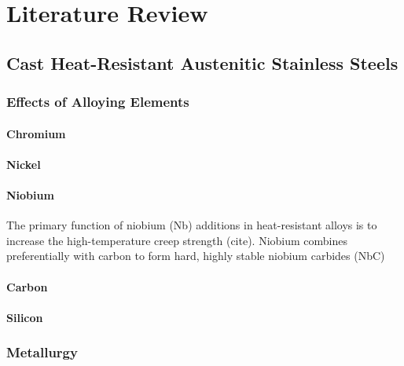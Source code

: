 \chapter{Literature Review} \label{ch:literature-review}

\section{Cast Heat-Resistant Austenitic Stainless Steels}


\subsection{Effects of Alloying Elements}
\subsubsection{Chromium}
\subsubsection{Nickel}
\subsubsection{Niobium}
The primary function of niobium (Nb) additions in heat-resistant alloys is to increase the high-temperature creep strength (cite). Niobium combines preferentially with carbon to form hard, highly stable niobium carbides (NbC)
\subsubsection{Carbon}
\subsubsection{Silicon}



\subsection{Metallurgy}

